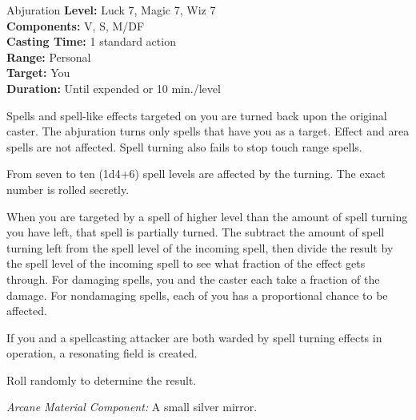 {Abjuration}
{
	\textbf{Level:}
	Luck 7, Magic 7, Wiz 7\\
	\textbf{Components:}
	V, S, M/DF\\
	\textbf{Casting Time:}
	1 standard action\\
	\textbf{Range:}
	Personal\\
	\textbf{Target:}
	You\\
	\textbf{Duration:}
	Until expended or 10 min./level\\
}
{
	Spells and spell-like effects targeted on you are turned back upon the original caster. The abjuration turns only spells that have you as a target. Effect and area spells are not affected. Spell turning also fails to stop touch range spells.

	From seven to ten (1d4+6) spell levels are affected by the turning. The exact number is rolled secretly.

	When you are targeted by a spell of higher level than the amount of spell turning you have left, that spell is partially turned. The subtract the amount of spell turning left from the spell level of the incoming spell, then divide the result by the spell level of the incoming spell to see what fraction of the effect gets through. For damaging spells, you and the caster each take a fraction of the damage. For nondamaging spells, each of you has a proportional chance to be affected.

	If you and a spellcasting attacker are both warded by spell turning effects in operation, a resonating field is created.

	Roll randomly to determine the result.


	\textit{Arcane Material Component:}
	A small silver mirror.

}
